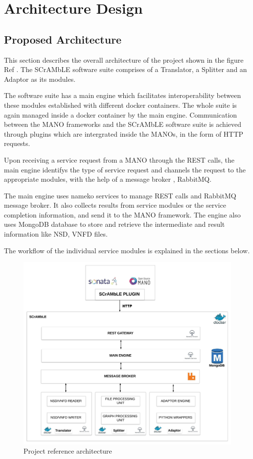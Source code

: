 \chapter{Architecture Design}
\label{ch:Architecture Design}

\section{Proposed Architecture}

This section describes the overall architecture of the project shown in the figure {Ref} . The SCrAMbLE software suite comprises of a Translator, a Splitter and an Adaptor as its modules.

The software suite has a main engine which facilitates interoperability between these modules established with different docker containers. The whole suite is again managed inside a docker container by the main engine. Communication between the MANO frameworks and the SCrAMbLE software suite is achieved through plugins which are intergrated inside the MANOs, in the form of HTTP requests.

Upon receiving a service request from a MANO through the REST calls, the main engine identifys the type of service request and channels the request to the appropriate modules, with the help of a message broker , RabbitMQ.

The main engine uses nameko services to manage REST calls and RabbitMQ message broker. It also collects results from service modules or the service completion information, and send it to the MANO framework. The engine also uses MongoDB database to store and retrieve the intermediate and result information like NSD, VNFD files.


The workflow of the individual service modules is explained in the sections below.


\begin{figure}[H]
	\centering
	\includegraphics[width=0.9\linewidth]{figures/Scramble_Architecture}
	\caption{Project reference architecture}
	\label{fig:Scramble_Architecture}
\end{figure}

